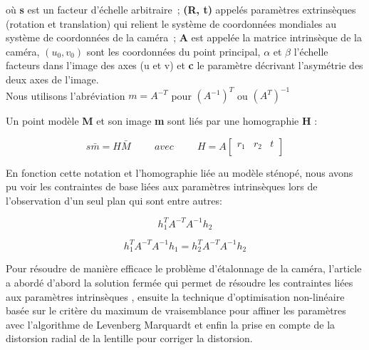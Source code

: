    
 
 où \textbf{s} est un facteur d'échelle arbitraire ; \textbf{(R, t)} appelés paramètres extrinsèques (rotation et translation) qui relient le système de coordonnées mondiales au système de coordonnées de la caméra ; \textbf{A} est appelée la matrice intrinsèque de la caméra, $(u_0, v_0)$ sont les coordonnées du point principal, $\alpha$ et $\beta $  l'échelle facteurs dans l'image des axes (u et v) et \textbf{c} le paramètre décrivant l'asymétrie des deux axes de l'image.\\
 Nous utilisons l'abréviation $m = A^{-T}$ pour
 $(A^{-1})^{T}$ ou $(A^{T})^{-1}$
 
  Un point modèle \textbf{M} et son image \textbf{m} sont liés par une homographie \textbf{H} :
  
\begin{equation} 
 s\bar{m}=H\bar{M}
 \hspace{1cm} 
 avec
 \hspace{1cm} 
 H=A
 \left[ 
 \begin{array}{ccc}
 	r_1 & r_2 & t\\
 \end{array} \right]
 \label{eq:homographie}
\end{equation}
 
 
 
 En fonction cette notation et  l'homographie liée au modèle sténopé, nous avons pu voir les contraintes de base liées aux paramètres intrinsèques lors de l'observation d'un seul plan qui sont entre autres:  
 
 \begin{equation} 
 h_{1}^{T} 
 A^{-T}
 A^{-1}
 h_2
 \label{eq:contrainte1}
 \end{equation}
 
 \begin{equation} 
 h_{1}^{T} 
 A^{-T}
 A^{-1}
 h_1
 =
 h_{2}^{T} 
 A^{-T}
 A^{-1}
 h_2
 \label{eq:contrainte2}
 \end{equation}
 
 Pour résoudre de manière efficace le problème d'étalonnage de la caméra, l'article a abordé d'abord la solution fermée qui permet de résoudre les contraintes liées aux paramètres intrinsèques , ensuite la technique d'optimisation non-linéaire basée sur le critère du maximum de vraisemblance pour affiner les paramètres avec l'algorithme de Levenberg ­Marquardt et enfin la prise en compte de la distorsion radial de la lentille pour corriger la distorsion. \\
 
